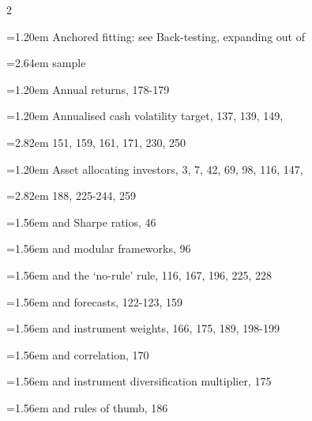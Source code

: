 {\begin{multicols}{2}
\par \noindent\hangindent=1.20em\hspace*{0.00em} Anchored fitting: see Back-testing, expanding out of
\par \noindent\hangindent=2.64em\hspace*{1.44em} sample
\par \noindent\hangindent=1.20em\hspace*{0.00em} Annual returns, 178-179
\par \noindent\hangindent=1.20em\hspace*{0.00em} Annualised cash volatility target, 137, 139, 149,
\par \noindent\hangindent=2.82em\hspace*{1.62em} 151, 159, 161, 171, 230, 250
\par \noindent\hangindent=1.20em\hspace*{0.00em} Asset allocating investors, 3, 7, 42, 69, 98, 116, 147,
\par \noindent\hangindent=2.82em\hspace*{1.62em} 188, 225-244, 259
\par \noindent\hangindent=1.56em\hspace*{0.36em} and Sharpe ratios, 46
\par \noindent\hangindent=1.56em\hspace*{0.36em} and modular frameworks, 96
\par \noindent\hangindent=1.56em\hspace*{0.36em} and the ‘no-rule’ rule, 116, 167, 196, 225, 228
\par \noindent\hangindent=1.56em\hspace*{0.36em} and forecasts, 122-123, 159
\par \noindent\hangindent=1.56em\hspace*{0.36em} and instrument weights, 166, 175, 189, 198-199
\par \noindent\hangindent=1.56em\hspace*{0.36em} and correlation, 170
\par \noindent\hangindent=1.56em\hspace*{0.36em} and instrument diversification multiplier, 175
\par \noindent\hangindent=1.56em\hspace*{0.36em} and rules of thumb, 186

\end{multicols}}
